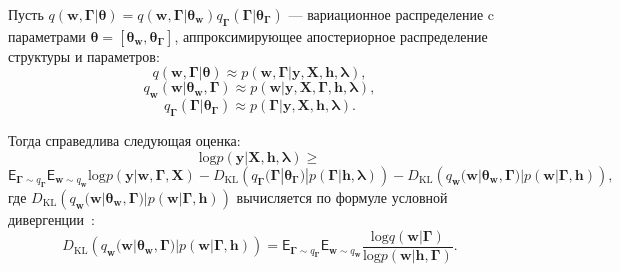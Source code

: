 \begin{theorem}
Пусть $q(\mathbf{w},\boldsymbol{\Gamma}|\boldsymbol{\theta})  = q(\mathbf{w},\boldsymbol{\Gamma}|\boldsymbol{\theta}_\mathbf{w})q_{\boldsymbol{\Gamma}}(\boldsymbol{\Gamma}|\boldsymbol{\theta}_{\boldsymbol{\Gamma}})$ --- вариационное распределение c параметрами $\boldsymbol{\theta}= [\boldsymbol{\theta}_\mathbf{w},\boldsymbol{\theta}_{\boldsymbol{\Gamma}} ]$, аппроксимирующее апостериорное распределение структуры и параметров:
\[
    q(\mathbf{w},\boldsymbol{\Gamma}|\boldsymbol{\theta}) \approx p(\mathbf{w},\boldsymbol{\Gamma}|\mathbf{y}, \mathbf{X}, \mathbf{h}, \boldsymbol{\lambda}),
\]
\[
    q_{\mathbf{w}}(\mathbf{w}|\boldsymbol{\theta}_\mathbf{w},\boldsymbol{\Gamma}) \approx p(\mathbf{w}|\mathbf{y}, \mathbf{X},  \boldsymbol{\Gamma},\mathbf{h}, \boldsymbol{\lambda}),
\]
\[
    q_{\boldsymbol{\Gamma}}(\boldsymbol{\Gamma}|\boldsymbol{\theta}_{\boldsymbol{\Gamma}}) \approx p(\boldsymbol{\Gamma}|\mathbf{y}, \mathbf{X},  \mathbf{h}, \boldsymbol{\lambda}).
\]

Тогда справедлива следующая оценка:
\begin{equation}
\label{eq:full_elbo}
\text{log} p(\mathbf{y}|\mathbf{X}, \mathbf{h}, \boldsymbol{\lambda}) \geq
\end{equation}
\[
 \mathsf{E}_{\boldsymbol{\Gamma} \sim q_{\boldsymbol{\Gamma}}}\mathsf{E}_{\mathbf{w} \sim q_{\mathbf{w}}} \text{log}p(\mathbf{y}|\mathbf{w}, \boldsymbol{\Gamma}, \mathbf{X}) - D_\text{KL}\left(q_{\boldsymbol{\Gamma}}(\boldsymbol{\Gamma}|\boldsymbol{\theta}_{\boldsymbol{\Gamma}})|p(\boldsymbol{\Gamma}|\mathbf{h}, \boldsymbol{\lambda})\right) - D_\text{KL}\left(q_{\mathbf{w}}(\mathbf{w}|\boldsymbol{\theta}_\mathbf{w},\boldsymbol{\Gamma})|p(\mathbf{w}|\boldsymbol{\Gamma}, \mathbf{h})\right),
\]
где $D_\text{KL}\left(q_{\mathbf{w}}(\mathbf{w}|\boldsymbol{\theta}_\mathbf{w},\boldsymbol{\Gamma})|p(\mathbf{w}|\boldsymbol{\Gamma}, \mathbf{h})\right)$ вычисляется по формуле условной дивергенции~\cite{TODO}:
\[
D_\text{KL}\left(q_{\mathbf{w}}(\mathbf{w}|\boldsymbol{\theta}_\mathbf{w},\boldsymbol{\Gamma})|p(\mathbf{w}|\boldsymbol{\Gamma}, \mathbf{h})\right) = \mathsf{E}_{\boldsymbol{\Gamma} \sim q_{\boldsymbol{\Gamma}}} \mathsf{E}_{\mathbf{w} \sim q_{\mathbf{w}}} \frac{\text{log}q(\mathbf{w}|\boldsymbol{\Gamma})}{\text{log}p(\mathbf{w}|\mathbf{h},\boldsymbol{\Gamma})}.
\]
\end{theorem}

